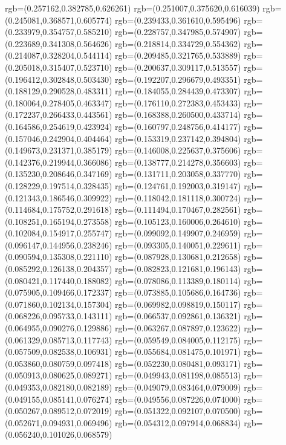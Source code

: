 {{{			rgb=(0.257162,0.382785,0.626261)
			rgb=(0.251007,0.375620,0.616039)
			rgb=(0.245081,0.368571,0.605774)
			rgb=(0.239433,0.361610,0.595496)
			rgb=(0.233979,0.354757,0.585210)
			rgb=(0.228757,0.347985,0.574907)
			rgb=(0.223689,0.341308,0.564626)
			rgb=(0.218814,0.334729,0.554362)
			rgb=(0.214087,0.328204,0.544114)
			rgb=(0.209485,0.321765,0.533889)
			rgb=(0.205018,0.315407,0.523710)
			rgb=(0.200637,0.309117,0.513557)
			rgb=(0.196412,0.302848,0.503430)
			rgb=(0.192207,0.296679,0.493351)
			rgb=(0.188129,0.290528,0.483311)
			rgb=(0.184055,0.284439,0.473307)
			rgb=(0.180064,0.278405,0.463347)
			rgb=(0.176110,0.272383,0.453433)
			rgb=(0.172237,0.266433,0.443561)
			rgb=(0.168388,0.260500,0.433714)
			rgb=(0.164586,0.254619,0.423924)
			rgb=(0.160797,0.248756,0.414177)
			rgb=(0.157046,0.242904,0.404464)
			rgb=(0.153319,0.237142,0.394804)
			rgb=(0.149673,0.231371,0.385179)
			rgb=(0.146008,0.225637,0.375606)
			rgb=(0.142376,0.219944,0.366086)
			rgb=(0.138777,0.214278,0.356603)
			rgb=(0.135230,0.208646,0.347169)
			rgb=(0.131711,0.203058,0.337770)
			rgb=(0.128229,0.197514,0.328435)
			rgb=(0.124761,0.192003,0.319147)
			rgb=(0.121343,0.186546,0.309922)
			rgb=(0.118042,0.181118,0.300724)
			rgb=(0.114684,0.175752,0.291618)
			rgb=(0.111494,0.170467,0.282561)
			rgb=(0.108251,0.165194,0.273558)
			rgb=(0.105123,0.160006,0.264610)
			rgb=(0.102084,0.154917,0.255747)
			rgb=(0.099092,0.149907,0.246959)
			rgb=(0.096147,0.144956,0.238246)
			rgb=(0.093305,0.140051,0.229611)
			rgb=(0.090594,0.135308,0.221110)
			rgb=(0.087928,0.130681,0.212658)
			rgb=(0.085292,0.126138,0.204357)
			rgb=(0.082823,0.121681,0.196143)
			rgb=(0.080421,0.117440,0.188082)
			rgb=(0.078086,0.113389,0.180114)
			rgb=(0.075905,0.109466,0.172337)
			rgb=(0.073885,0.105686,0.164736)
			rgb=(0.071860,0.102134,0.157304)
			rgb=(0.069982,0.098819,0.150117)
			rgb=(0.068226,0.095733,0.143111)
			rgb=(0.066537,0.092861,0.136321)
			rgb=(0.064955,0.090276,0.129886)
			rgb=(0.063267,0.087897,0.123622)
			rgb=(0.061329,0.085713,0.117743)
			rgb=(0.059549,0.084005,0.112175)
			rgb=(0.057509,0.082538,0.106931)
			rgb=(0.055684,0.081475,0.101971)
			rgb=(0.053860,0.080759,0.097418)
			rgb=(0.052230,0.080481,0.093171)
			rgb=(0.050913,0.080625,0.089271)
			rgb=(0.049943,0.081198,0.085513)
			rgb=(0.049353,0.082180,0.082189)
			rgb=(0.049079,0.083464,0.079009)
			rgb=(0.049155,0.085141,0.076274)
			rgb=(0.049556,0.087226,0.074000)
			rgb=(0.050267,0.089512,0.072019)
			rgb=(0.051322,0.092107,0.070500)
			rgb=(0.052671,0.094931,0.069496)
			rgb=(0.054312,0.097914,0.068834)
			rgb=(0.056240,0.101026,0.068579)
}}}
